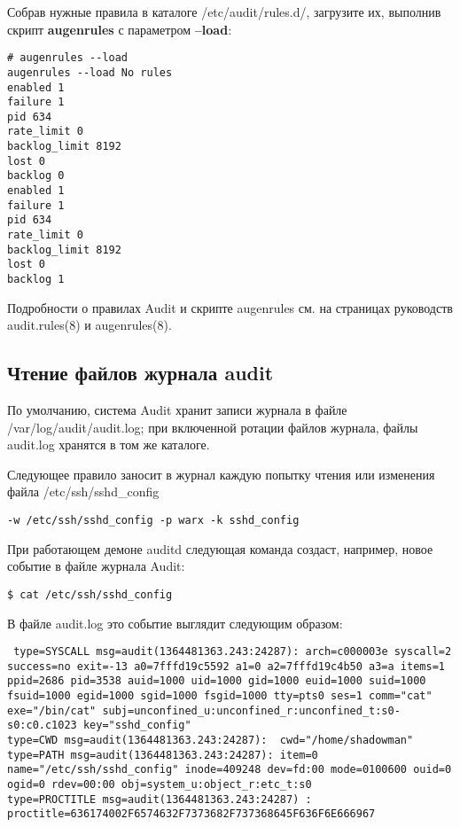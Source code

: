 \documentclass[a4paper,10pt,twoside]{article}
\begin{document}
Собрав нужные правила в каталоге /etc/audit/rules.d/, загрузите их, выполнив скрипт \textbf{augenrules} с параметром \textbf{--load}:
\begin{verbatim}
# augenrules --load
augenrules --load No rules
enabled 1
failure 1
pid 634
rate_limit 0
backlog_limit 8192
lost 0
backlog 0
enabled 1
failure 1
pid 634
rate_limit 0
backlog_limit 8192
lost 0
backlog 1
\end{verbatim} 

Подробности о правилах Audit и скрипте augenrules см. на страницах руководств audit.rules(8) и augenrules(8). 


\subsection{Чтение файлов журнала audit}
По умолчанию, система Audit хранит записи журнала в файле /var/log/audit/audit.log; при включенной ротации файлов журнала, файлы audit.log хранятся в том же каталоге.

Следующее правило заносит в журнал каждую попытку чтения или изменения файла /etc/ssh/sshd\_config
\begin{verbatim}
-w /etc/ssh/sshd_config -p warx -k sshd_config
\end{verbatim} 

При работающем демоне auditd следующая команда создаст, например, новое событие в файле журнала Audit: 
\begin{verbatim}
$ cat /etc/ssh/sshd_config
\end{verbatim} 

В файле audit.log это событие выглядит следующим образом:

\begin{verbatim}
 type=SYSCALL msg=audit(1364481363.243:24287): arch=c000003e syscall=2 success=no exit=-13 a0=7fffd19c5592 a1=0 a2=7fffd19c4b50 a3=a items=1 ppid=2686 pid=3538 auid=1000 uid=1000 gid=1000 euid=1000 suid=1000 fsuid=1000 egid=1000 sgid=1000 fsgid=1000 tty=pts0 ses=1 comm="cat" exe="/bin/cat" subj=unconfined_u:unconfined_r:unconfined_t:s0-s0:c0.c1023 key="sshd_config"
type=CWD msg=audit(1364481363.243:24287):  cwd="/home/shadowman"
type=PATH msg=audit(1364481363.243:24287): item=0 name="/etc/ssh/sshd_config" inode=409248 dev=fd:00 mode=0100600 ouid=0 ogid=0 rdev=00:00 obj=system_u:object_r:etc_t:s0
type=PROCTITLE msg=audit(1364481363.243:24287) : proctitle=636174002F6574632F7373682F737368645F636F6E666967
\end{verbatim} 
\end{document}
